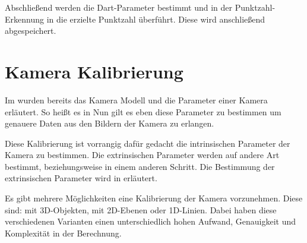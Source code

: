 Abschließend werden die Dart-Parameter bestimmt und in der Punktzahl-Erkennung in die erzielte Punktzahl überführt. Diese wird anschließend abgespeichert.


\section{Kamera Kalibrierung}
\label{sec:camera}
Im  wurden bereits das Kamera Modell und die Parameter einer Kamera erläutert. So heißt es in \autocite[5]{Zhang2000}  Nun gilt es eben diese Parameter zu bestimmen um genauere Daten aus den Bildern der Kamera zu erlangen. 

Diese Kalibrierung ist vorrangig dafür gedacht die intrinsischen Parameter der Kamera zu bestimmen. Die extrinsischen Parameter werden auf andere Art bestimmt, beziehungsweise in einem anderen Schritt. Die Bestimmung der extrinsischen Parameter wird in  erläutert.

Es gibt mehrere Möglichkeiten eine Kalibrierung der Kamera vorzunehmen. Diese sind: mit 3D-Objekten, mit 2D-Ebenen oder 1D-Linien. Dabei haben diese verschiedenen Varianten einen unterschiedlich hohen Aufwand, Genauigkeit und Komplexität in der Berechnung. 

